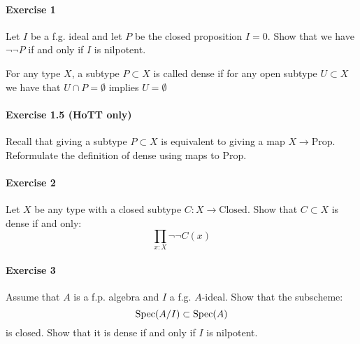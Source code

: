 \paragraph{Exercise 1}{
Let $I$ be a f.g. ideal and let $P$ be the closed proposition $I=0$. Show that we have $\neg\neg P$ if and only if $I$ is nilpotent.}

\begin{definition}
For any type $X$, a subtype $P\subset X$ is called dense if for any open subtype $U\subset X$ we have that $U\cap P = \emptyset$ implies $U=\emptyset$
\end{definition}

\paragraph{Exercise 1.5 (HoTT only)}{
Recall that giving a subtype $P\subset X$ is equivalent to giving a map $X\to \mathrm{Prop}$. Reformulate the definition of dense using maps to $\mathrm{Prop}$.
}

\paragraph{Exercise 2}{
Let $X$ be any type with a closed subtype $C:X\to \mathrm{Closed}$. Show that $C\subset X$ is dense if and only:
\[\prod_{x:X}\neg\neg C(x)\]
}

\paragraph{Exercise 3}{
Assume that $A$ is a f.p. algebra and $I$ a f.g. $A$-ideal. Show that the subscheme:
\[\operatorname{Spec}(A/I)\subset \operatorname{Spec}(A)\]
is closed. Show that it is dense if and only if $I$ is nilpotent.
}
